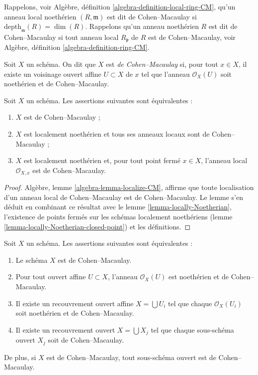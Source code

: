 \noindent
Rappelons, voir Algèbre, définition \ref{algebra-definition-local-ring-CM},
qu'un anneau local noethérien $(R, \mathfrak m)$ est
dit de Cohen--Macaulay si $\text{depth}_{\mathfrak m}(R) = \dim(R)$.
Rappelons qu'un anneau noethérien $R$ est dit de Cohen--Macaulay si
tout anneau local $R_{\mathfrak p}$ de $R$ est de
Cohen--Macaulay, voir Algèbre, définition \ref{algebra-definition-ring-CM}.

\begin{definition}
\label{definition-Cohen-Macaulay}
Soit $X$ un schéma. On dit que $X$ est {\it de Cohen--Macaulay} si,
pour tout $x \in X$, il existe un voisinage ouvert affine
$U \subset X$ de $x$ tel que l'anneau $\mathcal{O}_X(U)$ soit
noethérien et de Cohen--Macaulay.
\end{definition}

\begin{lemma}
\label{lemma-characterize-Cohen-Macaulay}
Soit $X$ un schéma. Les assertions suivantes sont équivalentes :
\begin{enumerate}
\item $X$ est de Cohen--Macaulay ;
\item $X$ est localement noethérien et tous ses anneaux locaux sont de
Cohen--Macaulay ;
\item $X$ est localement noethérien et, pour tout point fermé $x \in X$,
l'anneau local $\mathcal{O}_{X, x}$ est de Cohen--Macaulay.
\end{enumerate}
\end{lemma}

\begin{proof}
Algèbre, lemme \ref{algebra-lemma-localize-CM}, affirme que toute localisation d'un
anneau local de Cohen--Macaulay est de Cohen--Macaulay. Le lemme s'en déduit en
combinant ce résultat avec le lemme \ref{lemma-locally-Noetherian},
l'existence de points fermés
sur les schémas localement noethériens
(lemme \ref{lemma-locally-Noetherian-closed-point}) et
les définitions.
\end{proof}

\begin{lemma}
\label{lemma-locally-Cohen-Macaulay}
Soit $X$ un schéma. Les assertions suivantes sont équivalentes :
\begin{enumerate}
\item Le schéma $X$ est de Cohen--Macaulay.
\item Pour tout ouvert affine $U \subset X$, l'anneau $\mathcal{O}_X(U)$
est noethérien et de Cohen--Macaulay.
\item Il existe un recouvrement ouvert affine $X = \bigcup U_i$ tel que
chaque $\mathcal{O}_X(U_i)$ soit noethérien et de Cohen--Macaulay.
\item Il existe un recouvrement ouvert $X = \bigcup X_j$
tel que chaque sous-schéma ouvert $X_j$ soit de Cohen--Macaulay.
\end{enumerate}
De plus, si $X$ est de Cohen--Macaulay, tout sous-schéma ouvert
est de Cohen--Macaulay.
\end{lemma}

